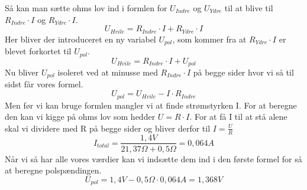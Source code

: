 Så kan man sætte ohms lov ind i formlen for $U_{Indre}$ og $U_{Ydre}$ til at blive til $R_{Indre} \cdot I$ og $R_{Ydre} \cdot I$.
\begin{equation*}
    U_{Hvile} = R_{Indre} \cdot I + R_{Ydre} \cdot I
\end{equation*}
Her bliver der introduceret en ny variabel $U_{pol}$, som kommer fra at $R_{Ydre} \cdot I$ er blevet forkortet til $U_{pol}$.
\begin{equation*}
    U_{Hvile} = R_{Indre} \cdot I + U_{pol}
\end{equation*}
Nu bliver $U_{pol}$ isoleret ved at minusse med $R_{Indre} \cdot I$ på begge sider hvor vi så til sidst får vores formel.
\begin{equation*}
    U_{pol}=U_{Hvile}-I\cdot R_{Indre}
\end{equation*}
Men før vi kan bruge formlen mangler vi at finde strømstyrken I. For at beregne den kan vi kigge på ohms lov som hedder $U = R \cdot I$. For at få I til at stå alene skal vi dividere med R på begge sider og bliver derfor til $I = \frac{U}{R}$
\begin{equation*}
    I_{total}=\frac{1,4V}{21,37\Omega+0,5\Omega}=0,064A
\end{equation*}
Når vi så har alle vores værdier kan vi indsætte dem ind i den første formel for så at beregne polspændingen.
\begin{equation*}
    U_{pol}=1,4V-0,5\Omega\cdot 0,064A=1,368V
\end{equation*}
\newpage